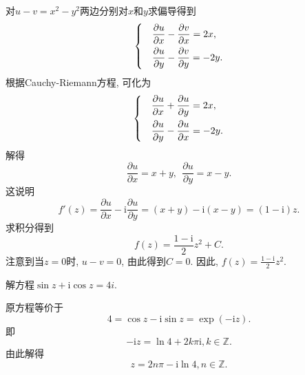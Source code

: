 \begin{yySolution}
    对$u-v = x^2 - y^2$两边分别对$x$和$y$求偏导得到
    \begin{equation*}
        \begin{dcases}
            &\frac{\partial u}{\partial x}-\frac{\partial v}{\partial x} = 2x, \\
            &\frac{\partial u}{\partial y}-\frac{\partial v}{\partial y} = -2y.
        \end{dcases}
    \end{equation*}
    根据Cauchy-Riemann方程, 可化为\begin{equation*}
        \begin{dcases}
            &\frac{\partial u}{\partial x}+\frac{\partial u}{\partial y} = 2x, \\
            &\frac{\partial u}{\partial y}-\frac{\partial u}{\partial x} = -2y.
        \end{dcases}
    \end{equation*}
    解得\begin{equation*}
        \frac{\partial u}{\partial x} = x+y,~~\frac{\partial u}{\partial y} = x-y.
    \end{equation*}
    这说明\begin{equation*}
        f'(z) = \frac{\partial u}{\partial x}-\mathrm{i}\frac{\partial u}{\partial y} = (x+y)-\mathrm{i}(x-y) = (1-\mathrm{i})z.
    \end{equation*}
    求积分得到\begin{equation*}
        f(z) = \frac{1-\mathrm{i}}{2}z^2 + C.
    \end{equation*}
    注意到当$z = 0$时, $u-v = 0$, 由此得到$C = 0$.
    因此, $f(z) = \frac{1-\mathrm{i}}{2}z^2$.
\end{yySolution}


\begin{yyEx}
	解方程$\sin z + \mathrm{i}\cos z = 4i$.
\end{yyEx}

\begin{yySolution}
	原方程等价于\begin{equation*}
		 4 = \cos z -\mathrm{i}\sin z = \exp(-\mathrm{i}z).
	\end{equation*}
	即\begin{equation*}
		-\mathrm{i}z = \ln 4 + 2k\pi\mathrm{i}, k\in\mathbb{Z}.
	\end{equation*}
	由此解得\begin{equation*}
		z = 2n\pi - \mathrm{i}\ln 4,n\in\mathbb{Z}.
	\end{equation*}
\end{yySolution}

